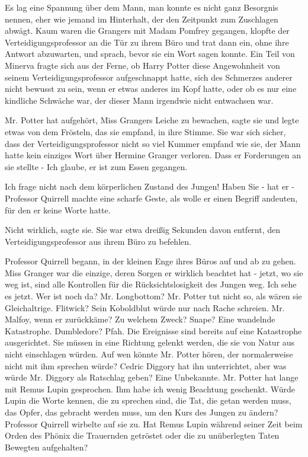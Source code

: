 Es lag eine Spannung über dem Mann, man konnte es nicht ganz Besorgnis nennen,
eher wie jemand im Hinterhalt, der den Zeitpunkt zum Zuschlagen abwägt. Kaum
waren die Grangers mit Madam Pomfrey gegangen, klopfte der
Verteidigungsprofessor an die Tür zu ihrem Büro und trat dann ein, ohne ihre
Antwort abzuwarten, und sprach, bevor sie ein Wort sagen konnte. Ein Teil von
Minerva fragte sich aus der Ferne, ob Harry Potter diese Angewohnheit von seinem
Verteidigungsprofessor aufgeschnappt hatte, sich des Schmerzes anderer nicht
bewusst zu sein, wenn er etwas anderes im Kopf hatte, oder ob es nur eine
kindliche Schwäche war, der dieser Mann irgendwie nicht entwachsen war.

\glqq{}Mr. Potter hat aufgehört, Miss Grangers Leiche zu bewachen\grqq{}, sagte
sie und legte etwas von dem Frösteln, das sie empfand, in ihre Stimme. Sie war
sich sicher, dass der Verteidigungsprofessor nicht so viel Kummer empfand wie
sie, der Mann hatte kein einziges Wort über Hermine Granger verloren. Dass er
Forderungen an sie stellte - \glqq{}Ich glaube, er ist zum Essen gegangen.\grqq{}

\glqq{}Ich frage nicht nach dem körperlichen Zustand des Jungen! Haben Sie - hat
er -\grqq{} Professor Quirrell machte eine scharfe Geste, als wolle er einen
Begriff andeuten, für den er keine Worte hatte.

\glqq{}Nicht wirklich\grqq{}, sagte sie. Sie war etwa dreißig Sekunden davon
entfernt, den Verteidigungsprofessor aus ihrem Büro zu befehlen.

Professor Quirrell begann, in der kleinen Enge ihres Büros auf und ab zu gehen.
\glqq{}Miss Granger war die einzige, deren Sorgen er wirklich beachtet hat -
jetzt, wo sie weg ist, sind alle Kontrollen für die Rücksichtslosigkeit des
Jungen weg. Ich sehe es jetzt. Wer ist noch da? Mr. Longbottom? Mr. Potter tut
nicht so, als wären sie Gleichaltrige. Flitwick? Sein Koboldblut würde nur nach
Rache schreien. Mr. Malfoy, wenn er zurückkäme? Zu welchem Zweck? Snape? Eine
wandelnde Katastrophe. Dumbledore? Pfah. Die Ereignisse sind bereits auf eine
Katastrophe ausgerichtet. Sie müssen in eine Richtung gelenkt werden, die sie
von Natur aus nicht einschlagen würden. Auf wen könnte Mr. Potter hören, der
normalerweise nicht mit ihm sprechen würde? Cedric Diggory hat ihn unterrichtet,
aber was würde Mr. Diggory als Ratschlag geben? Eine Unbekannte. Mr. Potter hat
lange mit Remus Lupin gesprochen. Ihm habe ich wenig Beachtung geschenkt. Würde
Lupin die Worte kennen, die zu sprechen sind, die Tat, die getan werden muss,
das Opfer, das gebracht werden muss, um den Kurs des Jungen zu ändern?\grqq{}
Professor Quirrell wirbelte auf sie zu. \glqq{}Hat Remus Lupin während seiner
Zeit beim Orden des Phönix die Trauernden getröstet oder die zu unüberlegten
Taten Bewegten aufgehalten?\grqq{}

